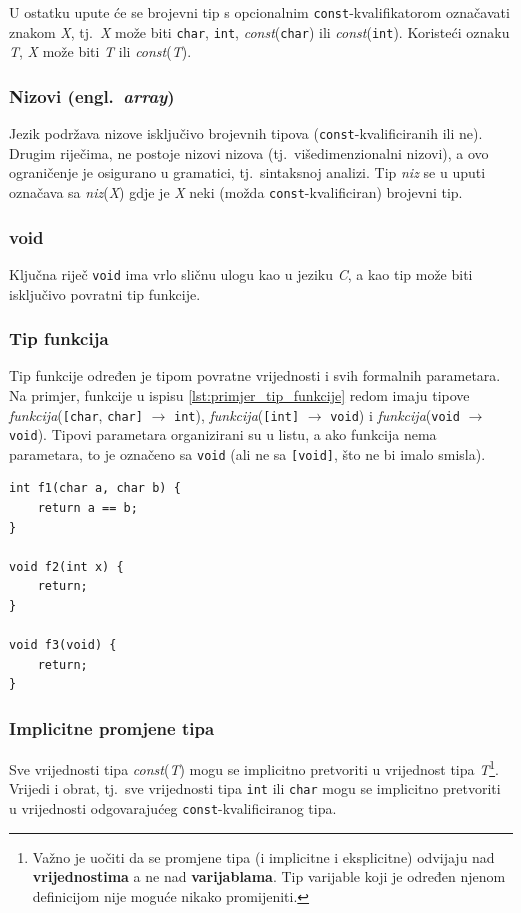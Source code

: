 \documentclass[times, 12pt, utf8]{book}
\begin{document}
U ostatku upute će se brojevni tip s opcionalnim \verb|const|-kvalifikatorom označavati znakom \emph{X}, tj.~\emph{X} može biti \verb|char|, \verb|int|, \emph{const}(\verb|char|) ili \emph{const}(\verb|int|).
Koristeći oznaku \emph{T}, \emph{X} može biti \emph{T} ili \emph{const}(\emph{T}).

\subsubsection{Nizovi (engl.~\emph{array})}
Jezik podržava nizove isključivo brojevnih tipova (\verb|const|-kvalificiranih ili ne).
Drugim riječima, ne postoje nizovi nizova (tj.~višedimenzionalni nizovi), a ovo ograničenje je osigurano u gramatici, tj.~sintaksnoj analizi.
Tip \emph{niz} se u uputi označava sa \emph{niz}(\emph{X}) gdje je \emph{X} neki (možda \verb|const|-kvalificiran) brojevni tip.

\subsubsection{void}
Ključna riječ \verb|void| ima vrlo sličnu ulogu kao u jeziku \emph{C}, a kao tip može biti isključivo povratni tip funkcije.

\subsubsection{Tip funkcija}
Tip funkcije određen je tipom povratne vrijednosti i svih formalnih parametara.
Na primjer, funkcije u ispisu \ref{lst:primjer_tip_funkcije} redom imaju tipove \emph{funkcija}(\verb|[char|, \verb|char]| \(\to\) \verb|int|), \emph{funkcija}(\verb|[int]| \(\to\) \verb|void|) i \emph{funkcija}(\verb|void| \(\to\) \verb|void|).
Tipovi parametara organizirani su u listu, a ako funkcija nema parametara, to je označeno sa \verb|void| (ali ne sa \verb|[void]|, što ne bi imalo smisla).

\begin{lstlisting}[caption={Primjer jednostavne funkcije.},label=lst:primjer_tip_funkcije]
int f1(char a, char b) {
    return a == b;
}

void f2(int x) {
    return;
}

void f3(void) {
    return;
}
\end{lstlisting}

\subsubsection{Implicitne promjene tipa}
Sve vrijednosti tipa \emph{const}(\emph{T}) mogu se implicitno pretvoriti u vrijednost tipa \emph{T}\footnote{Važno je uočiti da se promjene tipa (i implicitne i eksplicitne) odvijaju nad \textbf{vrijednostima} a ne nad \textbf{varijablama}. Tip varijable koji je određen njenom definicijom nije moguće nikako promijeniti.}.
Vrijedi i obrat, tj.~sve vrijednosti tipa \verb|int| ili \verb|char| mogu se implicitno pretvoriti u vrijednosti odgovarajućeg \verb|const|-kvalificiranog tipa.
\end{document}
